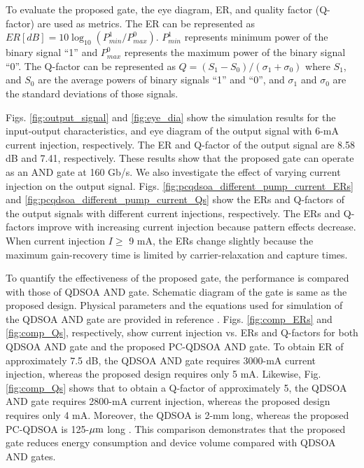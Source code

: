 \documentclass[twocolumn]{el-author}
\begin{document}
\newpage
To evaluate the proposed gate, the eye diagram, ER, and quality factor (Q-factor) are used as metrics. The ER can be represented as $ER[dB] = 10\log_{10} \left(P^{1}_{min} / P^{0}_{max} \right)$. $P^{1}_{min}$ represents minimum power of the binary signal ``1'' and $P^{0}_{max}$ represents the maximum power of the binary signal ``0''. The Q-factor can be represented as $Q = (S_{1}-S_{0})/(\sigma_{1}+\sigma_{0}) $ where $S_{1}$, and $S_{0}$ are the average powers of binary signals ``1'' and ``0'', and $\sigma_{1}$ and $\sigma_{0}$ are the standard deviations of those signals. \par
Figs. {\ref{fig:output_signal}} and {\ref{fig:eye_dia}} show the simulation results for the input-output characteristics, and eye diagram of the output signal with 6-mA current injection, respectively. The ER and Q-factor of the output signal are 8.58 dB and 7.41, respectively. These results show that the proposed gate can operate as an AND gate at 160 Gb/s. We also investigate the effect of varying current injection on the output signal. Figs. {\ref{fig:pcqdsoa_different_pump_current_ERs}} and {\ref{fig:pcqdsoa_different_pump_current_Qs}} show the ERs and Q-factors of the output signals with different current injections, respectively. The ERs and Q-factors improve with increasing current injection because pattern effects decrease. When current injection $I \geq$ 9 mA, the ERs change slightly because the maximum gain-recovery time is limited by carrier-relaxation and capture times. \par
To quantify the effectiveness of the proposed gate, the performance is compared with those of QDSOA AND gate. Schematic diagram of the gate is same as the proposed design. Physical parameters and the equations used for simulation of the QDSOA AND gate are provided in reference {\cite{qdsoa_nssm}}. Figs. {\ref{fig:comp_ERs}} and {\ref{fig:comp_Qs}}, respectively, show current injection vs. ERs and Q-factors for both QDSOA AND gate and the proposed PC-QDSOA AND gate. To obtain ER of approximately 7.5 dB, the QDSOA AND gate requires 3000-mA current injection, whereas the proposed design requires only 5 mA. Likewise, Fig. {\ref{fig:comp_Qs}} shows that to obtain a Q-factor of approximately 5, the QDSOA AND gate requires 2800-mA current injection, whereas the proposed design requires only 4 mA. Moreover, the QDSOA is 2-mm long, whereas the proposed PC-QDSOA is 125-${\rm{\mu m}}$ long {\cite{qdsoa_nssm,pcqdsoa}}. This comparison demonstrates that the proposed gate reduces energy consumption and device volume compared with QDSOA AND gates.
\end{document}

